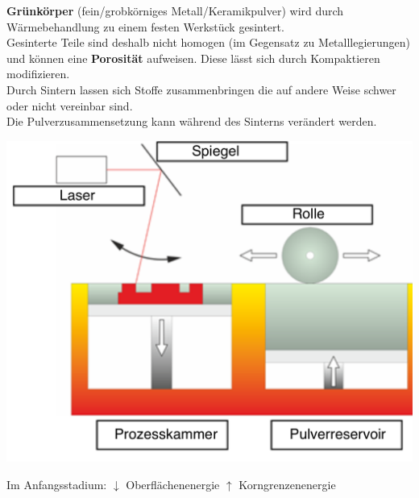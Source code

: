 \textbf{Grünkörper} (fein/grobkörniges Metall/Keramikpulver) wird durch 
Wärmebehandlung zu einem festen Werkstück gesintert.\\
Gesinterte Teile sind deshalb nicht homogen (im Gegensatz zu 
Metalllegierungen) und können eine \textbf{Porosität} aufweisen. Diese lässt 
sich durch Kompaktieren modifizieren.\\
Durch Sintern lassen sich Stoffe zusammenbringen die auf andere 
Weise schwer oder nicht vereinbar sind.\\
Die Pulverzusammensetzung kann während des Sinterns verändert werden.\\
\begin{center}
    \includegraphics[width =0.6\linewidth]{src/images/Sintern.png}\\
\end{center}
Im Anfangsstadium:
$\downarrow$ Oberflächenenergie
$\uparrow$ Korngrenzenenergie